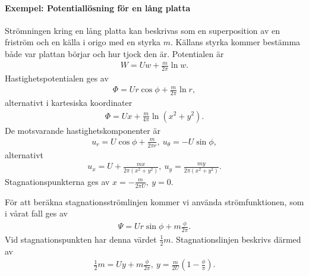 \paragraph{Exempel: Potentiallösning för en lång platta}
Strömningen kring en lång platta kan beskrivas som en superposition av en friström och en källa i origo med en styrka $m$. Källans styrka kommer bestämma både var plattan börjar och hur tjock den är. Potentialen är
\begin{align*}
	W = Uw + \frac{m}{2\pi}\ln{w}.
\end{align*}
Hastighetspotentialen ges av
\begin{align*}
	\Phi = Ur\cos{\phi} + \frac{m}{2\pi}\ln{r},
\end{align*}
alternativt i kartesiska koordinater
\begin{align*}
	\Phi = Ux + \frac{m}{4\pi}\ln(x^{2} + y^{2}).
\end{align*}
De motsvarande hastighetskomponenter är
\begin{align*}
	u_{r} = U\cos{\phi} + \frac{m}{2\pi r},\ u_{\theta} = -U\sin{\phi},
\end{align*}
alternativt
\begin{align*}
	u_{x} = U + \frac{mx}{2\pi(x^{2} + y^{2})},\ u_{y} = \frac{my}{2\pi(x^{2} + y^{2})}.
\end{align*}
Stagnationspunkterna ges av $x = -\frac{m}{2\pi U},\ y = 0$.

För att beräkna stagnationsströmlinjen kommer vi använda strömfunktionen, som i vårat fall ges av
\begin{align*}
	\Psi = Ur\sin{\phi} + m\frac{\phi}{2\pi}.
\end{align*}
Vid stagnationspunkten har denna värdet $\frac{1}{2}m$. Stagnationslinjen beskrivs därmed av
\begin{align*}
	\frac{1}{2}m = Uy + m\frac{\phi}{2\pi},\ y = \frac{m}{2U}\left(1 - \frac{\phi}{\pi}\right).
\end{align*}